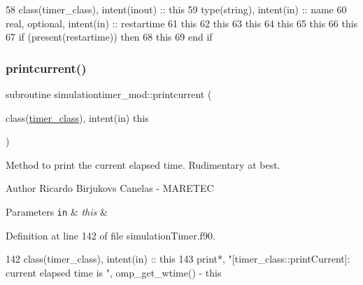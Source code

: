 \begin{DoxyCode}
58     \textcolor{keywordtype}{class}(timer\_class), \textcolor{keywordtype}{intent(inout)} :: this
59     \textcolor{keywordtype}{type}(string), \textcolor{keywordtype}{intent(in)} :: name
60     \textcolor{keywordtype}{real}, \textcolor{keywordtype}{optional}, \textcolor{keywordtype}{intent(in)} :: restartime
61     this%
62     this%
63     this%
64     this%
65     this%
66     this%
67     \textcolor{keywordflow}{if} (\textcolor{keyword}{present}(restartime)) \textcolor{keywordflow}{then}
68         this%
69 \textcolor{keywordflow}{    end if}
\end{DoxyCode}
\mbox{\label{namespacesimulationtimer__mod_abf4d4c3f383597e975e7c9d12dab6f13}} 
\subsubsection{\texorpdfstring{printcurrent()}{printcurrent()}}
{\footnotesize\ttfamily subroutine simulationtimer\+\_\+mod\+::printcurrent (\begin{DoxyParamCaption}\item[{class(\mbox{\hyperlink{structsimulationtimer__mod_1_1timer__class}{timer\+\_\+class}}), intent(in)}]{this }\end{DoxyParamCaption})\hspace{0.3cm}{\ttfamily [private]}}



Method to print the current elapsed time. Rudimentary at best. 

\begin{DoxyAuthor}{Author}
Ricardo Birjukovs Canelas -\/ M\+A\+R\+E\+T\+EC 
\end{DoxyAuthor}

\begin{DoxyParams}[1]{Parameters}
\mbox{\tt in}  & {\em this} & \\
\hline
\end{DoxyParams}


Definition at line 142 of file simulation\+Timer.\+f90.


\begin{DoxyCode}
142     \textcolor{keywordtype}{class}(timer\_class), \textcolor{keywordtype}{intent(in)} :: this
143     print*, \textcolor{stringliteral}{"[timer\_class::printCurrent]: current elapsed time is "}, omp\_get\_wtime() - this%
\end{DoxyCode}
\mbox{\label{namespacesimulationtimer__mod_a9df6f995616d7fa53094178c3aff1fad}} 
